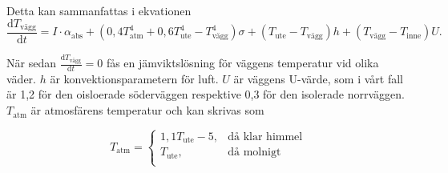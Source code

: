 Detta kan sammanfattas i ekvationen 
\begin{equation}
\frac{\mathrm{d}T_\text{vägg}}{\mathrm{d}t} = 
I\cdot \alpha_\text{abs} + (0,4 T_\text{atm}^4 + 0,6 T_\text{ute}^4 - T_\text{vägg}^4 )\sigma + (T_\text{ute} - T_\text{vägg}) h + ( T_\text{vägg} - T_\text{inne} ) U.
\end{equation}

När sedan $\frac{\mathrm{d}T_\text{vägg}}{\mathrm{d}t}=0$ fås en jämviktslösning för väggens temperatur vid olika väder. $h$ är konvektionsparametern för luft. $U$ är väggens U-värde, som i vårt fall är 1,2 för den oisloerade söderväggen respektive 0,3 för den isolerade norrväggen. $T_\text{atm}$ är atmosfärens temperatur och kan skrivas som\cite[ss.~54]{Hagentoft01}

\begin{equation}
T_\text{atm}= \left\{
\begin{array}{rl}
1,1T_\text{ute} -5, & \text{då klar himmel} \\
T_\text{ute}, & \text{då molnigt} \\
\end{array} \right.
\end{equation}


